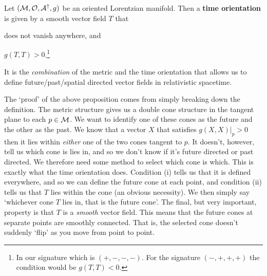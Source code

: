     Let $(\mathcal{M},\mathcal{O},\mathcal{A}^{\uparrow},g)$ be an oriented Lorentzian manifold. Then a \textbf{time orientation} is given by a smooth vector field $T$ that 
    \benr 
        \item does not vanish anywhere, and 
        \item $g(T,T)>0$.\footnote{In our signature which is $(+,-,-,-)$. For the signature $(-,+,+,+)$ the condition would be $g(T,T)<0$.}
    \een 
\ed 

\bp 
    It is the \textit{combination} of the metric and the time orientation that allows us to define future/past/spatial directed vector fields in relativistic spacetime.
\ep 

The `proof' of the above proposition comes from simply breaking down the definition. The metric structure gives us a double cone structure in the tangent plane to each $p\in\mathcal{M}$. We want to identify one of these cones as the future and the other as the past. We know that a vector $X$ that satisfies $g(X,X)|_p>0$ then it lies within \textit{either} one of the two cones tangent to $p$. It doesn't, however, tell us which cone is lies in, and so we don't know if it's future directed or past directed. We therefore need some method to select which cone is which. This is exactly what the time orientation does. Condition (i) tells us that it is defined everywhere, and so we can define the future cone at each point, and condition (ii) tells us that $T$ lies within the cone (an obvious necessity). We then simply say `whichever cone $T$ lies in, that is the future cone'. The final, but very important, property is that $T$ is a \textit{smooth} vector field. This means that the future cones at separate points are smoothly connected. That is, the selected cone doesn't suddenly `flip' as you move from point to point. 

